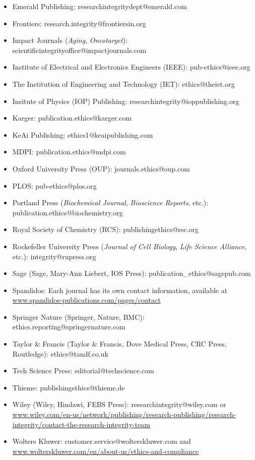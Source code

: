 \documentclass[letterpaper, 12pt]{article}
\begin{document}
\begin{itemize}
    \item Emerald Publishing: researchintegritydept@emerald.com
    \item Frontiers: research.integrity@frontiersin.org
    \item Impact Journals (\textit{Aging}, \textit{Oncotarget}): scientificintegrityoffice@impactjournals.com
    \item Institute of Electrical and Electronics Engineers (IEEE): pub-ethics@ieee.org
    \item The Institution of Engineering and Technology (IET): ethics@theiet.org
    \item Insitute of Physics (IOP) Publishing: researchintegrity@ioppublishing.org
    \item Karger: publication.ethics@karger.com
    \item KeAi Publishing: ethics1@keaipublishing.com
    \item MDPI: publication.ethics@mdpi.com
    \item Oxford University Press (OUP): journals.ethics@oup.com
    \item PLOS: pub-ethics@plos.org
    \item Portland Press (\textit{Biochemical Journal}, \textit{Bioscience Reports}, etc.): publication.ethics@biochemistry.org
    \item Royal Society of Chemistry (RCS): publishingethics@rsc.org
    \item Rockefeller University Press (\textit{Journal of Cell Biology}, \textit{Life Science Alliance}, etc.): integrity@rupress.org
    \item Sage (Sage, Mary-Ann Liebert, IOS Press): publication\_ethics@sagepub.com
    \item Spandidos: Each journal has its own contact information, available at \href{https://www.spandidos-publications.com/pages/contact}{www.spandidos-publications.com/pages/contact}
    \item Springer Nature (Springer, Nature, BMC): ethics.reporting@springernature.com
    \item Taylor \& Francis (Taylor \& Francis, Dove Medical Press, CRC Press, Routledge): ethics@tandf.co.uk
    \item Tech Science Press: editorial@techscience.com
    \item Thieme: publishingethics@thieme.de
    \item Wiley (Wiley, Hindawi, FEBS Press): researchintegrity@wiley.com or \href{https://www.wiley.com/en-us/network/publishing/research-publishing/research-integrity/contact-the-research-integrity-team}{www.wiley.com/en-us/network/publishing/research-publishing/research-integrity/contact-the-research-integrity-team}
    \item Wolters Kluwer: customer.service@wolterskluwer.com and \href{https://www.wolterskluwer.com/en/about-us/ethics-and-compliance}{www.wolterskluwer.com/en/about-us/ethics-and-compliance}
\end{itemize}
\end{document}
